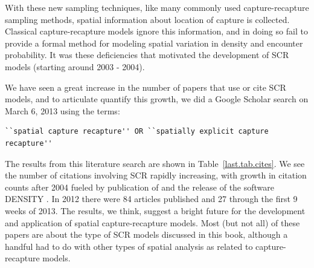 With these new sampling techniques, like many commonly used
capture-recapture sampling methods,
spatial information about location of capture is
collected. %
Classical capture-recapture models ignore this information, and in
doing so fail to provide a formal method for modeling spatial
variation in density and encounter
probability. %
It was these deficiencies that motivated %
the development of SCR models (starting around
2003 - 2004).

We have seen a great increase in the number of papers that use or cite SCR models, and to
articulate quantify this growth,
we did a Google Scholar search on
March 6, 2013 using the terms:
\begin{small}
\begin{verbatim}
``spatial capture recapture'' OR ``spatially explicit capture recapture''
\end{verbatim}
\end{small}
The results from this literature search are shown
 in Table~\ref{last.tab.cites}.
We see the number of citations involving SCR rapidly increasing,
with growth in citation counts after 2004 fueled by publication of
\citet{efford:2004} and the release of the software DENSITY
\citep{efford_etal:2004}. In 2012 there were 84 articles published and
27 through the first 9 weeks of 2013.
The results, we think, suggest a bright future
for the development and application of spatial capture-recapture
models. Most (but not all) of these papers are about the type of SCR models
discussed in this book, although a handful had to
do with other types of spatial analysis as related to
capture-recapture models.

